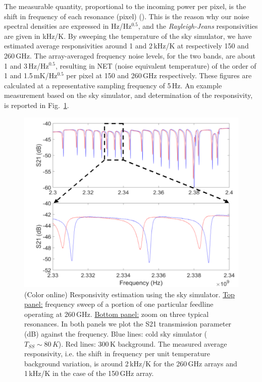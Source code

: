 \documentclass[]{aa} %
\begin{document}
The measurable quantity, proportional to the incoming power per pixel, is the shift in frequency of each resonance (pixel) (\cite{Swenson2010}). This is the reason why our noise spectral densities are expressed in Hz/Hz$^{0.5}$, and the \textit{Rayleigh-Jeans} responsivities are given in kHz/K. By sweeping the temperature of the sky simulator, we have estimated average responsivities around 1 and 2\,kHz/K at respectively 150 and 260\,GHz. The array-averaged frequency noise levels, for the two bands, are about 1 and 3\,Hz/Hz$^{0.5}$, resulting in NET (noise equivalent temperature) of the order of 1 and 1.5\,mK/Hz$^{0.5}$ per pixel at 150 and 260\,GHz respectively. These figures are calculated at a representative sampling frequency of 5\,Hz. An example measurement based on the sky simulator, and determination of the responsivity, is reported in Fig.~\ref{Shift_f}. 

\begin{figure}[h]
\begin{center}
   \centering
    \includegraphics[width=1.0\linewidth]{260GHz-H_sky.png}
    \caption{(Color online) Responsivity estimation using the sky simulator. \underline{Top panel:} frequency sweep of a portion of one particular feedline operating at 260\,GHz. \underline{Bottom panel:} zoom on three typical resonances. In both panels we plot the S21 transmission parameter (dB) against the frequency. Blue lines: cold sky simulator ($T_{SS} \sim 80\,K$). Red lines: 300\,K background. The measured average responsivity, i.e. the shift in frequency per unit temperature background variation, is around 2\,kHz/K for the 260\,GHz arrays and 1\,kHz/K in the case of the 150\,GHz array.}
         \label{Shift_f}
\end{center}
\end{figure}
\end{document}
